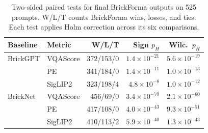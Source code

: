 \begin{table}[t]
\centering\small
\setlength{\tabcolsep}{3pt}
\begin{tabular}{llrrr}
\toprule
Baseline & Metric & W/L/T & Sign $p_H$ & Wilc.\ $p_H$ \\
\midrule
BrickGPT & VQAScore & 372/153/0 & $1.4\times 10^{-21}$ & $5.6\times 10^{-19}$ \\
 & PE & 341/184/0 & $1.4\times 10^{-11}$ & $1.0\times 10^{-13}$ \\
 & SigLIP2 & 323/198/4 & $4.8\times 10^{-8}$ & $1.0\times 10^{-12}$ \\
BrickNet & VQAScore & 456/69/0 & $3.4\times 10^{-70}$ & $2.1\times 10^{-60}$ \\
 & PE & 417/108/0 & $4.0\times 10^{-43}$ & $9.3\times 10^{-51}$ \\
 & SigLIP2 & 410/113/2 & $5.9\times 10^{-40}$ & $1.3\times 10^{-43}$ \\
\bottomrule
\end{tabular}
\caption{Two-sided paired tests for final BrickForma outputs on 525 prompts. W/L/T counts BrickForma wins, losses, and ties. Each test applies Holm correction across its six comparisons.}
\label{tab:sig}
\end{table}
